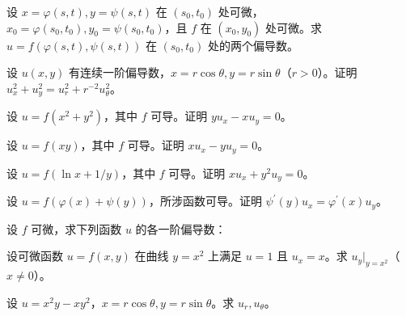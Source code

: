 \newpage
\noindent\begin{minipage}{\textwidth}
设 $x=\varphi(s,t),y=\psi(s,t)$ 在 $(s_0,t_0)$ 处可微，$x_0=\varphi(s_0,t_0),y_0=\psi(s_0,t_0)$，且 $f$ 在 $(x_0,y_0)$ 处可微。求 $u=f(\varphi(s,t),\psi(s,t))$ 在 $(s_0,t_0)$ 处的两个偏导数。
\end{minipage}\par\vfill
\noindent\begin{minipage}{\textwidth}
设 $u(x,y)$ 有连续一阶偏导数，$x=r\cos\theta,y=r\sin\theta$（$r>0$）。证明 $u_x^2+u_y^2=u_r^2+r^{-2}u_\theta^2$。
\end{minipage}\par\vfill
\noindent\begin{minipage}{\textwidth}
设 $u=f(x^2+y^2)$，其中 $f$ 可导。证明 $yu_x-xu_y=0$。
\end{minipage}\par\vfill
\newpage
\noindent\begin{minipage}{\textwidth}
设 $u=f(xy)$，其中 $f$ 可导。证明 $xu_x-yu_y=0$。
\end{minipage}\par\vfill
\noindent\begin{minipage}{\textwidth}
设 $u=f(\ln x+1/y)$，其中 $f$ 可导。证明 $xu_x+y^2u_y=0$。
\end{minipage}\par\vfill
\noindent\begin{minipage}{\textwidth}
设 $u=f(\varphi(x)+\psi(y))$，所涉函数可导。证明 $\psi^{\prime}(y)u_x=\varphi^{\prime}(x)u_y$。
\end{minipage}\par\vfill
\newpage
\noindent\begin{minipage}{\textwidth}
设 $f$ 可微，求下列函数 $u$ 的各一阶偏导数：
\end{minipage}\par\vfill
\noindent\begin{minipage}{\textwidth}
设可微函数 $u=f(x,y)$ 在曲线 $y=x^2$ 上满足 $u=1$ 且 $u_x=x$。求 $u_y|_{y=x^2}$（$x\ne0$）。
\end{minipage}\par\vfill
\noindent\begin{minipage}{\textwidth}
设 $u=x^2y-xy^2$，$x=r\cos\theta,y=r\sin\theta$。求 $u_r,u_\theta$。
\end{minipage}\par\vfill
